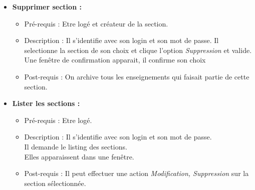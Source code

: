 \begin{itemize}
\item  {\bf Supprimer section :}
	\begin{itemize}
	\item Pr{\'e}-requis : Etre log{\'e} et cr{\'e}ateur de la section.
	\item Description : Il s'identifie avec son login et son mot de passe.
	Il selectionne la section de son choix et clique l'option {\it Suppression} et valide.\\
	Une fen{\^e}tre de confirmation apparait, il confirme son choix
	\item Post-requis : On archive tous les enseignements qui faisait partie de cette section.
	\end{itemize}
\item  {\bf Lister les sections :}
	\begin{itemize}
	\item Pr{\'e}-requis : Etre log{\'e}.
	\item Description : Il s'identifie avec son login et son mot de passe.\\
	Il demande le listing des sections.\\
	Elles apparaissent dans une fen{\^e}tre.
	\item Post-requis : Il peut effectuer une action {\it Modification, Suppression} sur la section s{\'e}lectionn{\'e}e.\\
	\end{itemize}
\end{itemize}
